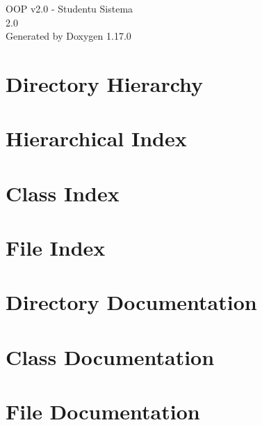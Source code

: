 \documentclass[twoside]{book}
\newcommand{\+}{\discretionary{\mbox{\scriptsize$\hookleftarrow$}}{}{}}
\newcommand{\clearemptydoublepage}{%
    \newpage{\pagestyle{empty}\cleardoublepage}%
  }
\begin{document}
  \raggedbottom
    \hypersetup{pageanchor=false,
                bookmarksnumbered=true,
                pdfencoding=unicode
               }
  \begin{titlepage}
  \vspace*{7cm}
  \begin{center}%
  {\Large OOP v2.\+0 -\/ Studentu Sistema}\\
  [1ex]\large 2.\+0 \\
  \vspace*{1cm}
  {\large Generated by Doxygen 1.17.0}\\
  \end{center}
  \end{titlepage}
  \clearemptydoublepage
  \tableofcontents
  \clearemptydoublepage
  \hypersetup{pageanchor=true}
\chapter{Directory Hierarchy}

\chapter{Hierarchical Index}

\chapter{Class Index}

\chapter{File Index}

\chapter{Directory Documentation}


\chapter{Class Documentation}


\chapter{File Documentation}








  \backmatter
  \newpage
  \clearemptydoublepage
  \printindex
\end{document}
